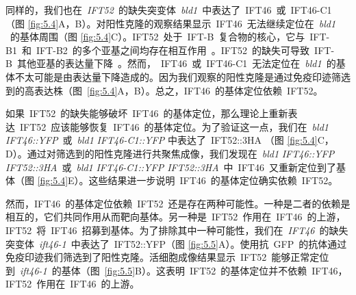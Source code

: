 \begin{figure}[h!tbp]
{\par}
\end{figure}

同样的，我们也在\ \textit{IFT52}\ 的缺失突变体\ \textit{bld1}\ 中表达了\ IFT46\ 或\ IFT46-C1 （图
\ref{fig:5.4}\allowbreak A，B）。对阳性克隆的观察结果显示\ IFT46\ 无法继续定位在\ \textit{bld1} \ 的基体周围（图
\ref{fig:5.4}C）。IFT52\ 处于\ IFT-B\ 复合物的核心，它与\ IFT-B1\ 和\ IFT-B2\ 的多个亚基之间均存在相互作用\
\citep{Taschner2016a,Lucker2005,Lucker2010,Taschner2011,Taschner2014,Katoh2016}。IFT52\ 的缺失可导致\ IFT-B\ 其他亚基的表达量下降\ \citep{Zhang2016,Deane2001,Collet1998,Brazelton2001}。然而，\ IFT46\ 或\ IFT46-C1\ 无法定位在\
\textit{bld1}\ 的基体不太可能是由表达量下降造成的。因为我们观察的阳性克隆是通过免疫印迹筛选到的高表达株（图\ \ref{fig:5.4}A，B）。总之，IFT46\ 的基体定位依赖\ IFT52。

如果\ IFT52\ 的缺失能够破坏\ IFT46\ 的基体定位，那么理论上重新表达\ IFT52\ 应该能够恢复\ IFT46\ 的基体定位。为了验证这一点，我们在\ \textit{bld1} \textit{IFT46::YFP}\ 或\ \textit{bld1} \textit{IFT46-C1::YFP} 中表达了\ IFT52::3HA （图
\ref{fig:5.4}C，D）。通过对筛选到的阳性克隆进行共聚焦成像，我们发现在\ \textit{bld1} \textit{IFT46::YFP IFT52::3HA}\ 或\ \textit{bld1} \textit{IFT46-C1::YFP IFT52::3HA}\ 中\ IFT46\ 又重新定位到了基体（图
\ref{fig:5.4}E）。这些结果进一步说明\ IFT46\ 的基体定位确实依赖\ IFT52。

然而，IFT46\ 的基体定位依赖\ IFT52\ 还是存在两种可能性。一种是二者的依赖是相互的，它们共同作用从而靶向基体。另一种是\ IFT52\ 作用在\ IFT46\ 的上游，IFT52\ 将\ IFT46\ 招募到基体。为了排除其中一种可能性，我们在\ \textit{IFT46}\ 的缺失突变体\
\textit{ift46-1}\ 中表达了\ IFT52::YFP（图
\ref{fig:5.5}A）。使用抗\ GFP\ 的抗体通过免疫印迹我们筛选到了阳性克隆。活细胞成像结果显示\ IFT52\ 能够正常定位到\
\textit{ift46-1}\ 的基体（图\ \ref{fig:5.5}B）。这表明\ IFT52\ 的基体定位并不依赖\ IFT46，IFT52\ 作用在\ IFT46\ 的上游。

